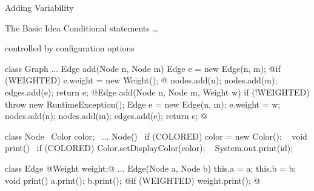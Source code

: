 \begin{frame}[fragile]{Adding Variability}
	\small
	\begin{fancycolumns}[b,widths={53},height=70mm]
		{\normalsize \begin{definition}{The Basic Idea}
			Conditional statements \ldots

			controlled by configuration options
		\end{definition}}
\begin{codetight}{}
class Graph {
	...
	Edge add(Node n, Node m) {
		Edge e = new Edge(n, m);
		@if (WEIGHTED) { e.weight = new Weight(); }@
		nodes.add(n); nodes.add(m); edges.add(e);
		return e;
	}
	@Edge add(Node n, Node m, Weight w) {
		if (!WEIGHTED) { throw new RuntimeException(); }
		Edge e = new Edge(n, m);
		e.weight = w;
		nodes.add(n); nodes.add(m); edges.add(e);
		return e;
	}@
}
\end{codetight}
	\nextcolumn
\begin{codetight}{}
class Node {
	~Color color;~
	...
	Node() {
		~if (COLORED) { color = new Color(); }~
	}
	void print() {
		~if (COLORED) { Color.setDisplayColor(color); }~
		System.out.print(id);
	}
}
\end{codetight}
\begin{codetight}{}
class Edge {
	@Weight weight;@
	...
	Edge(Node a, Node b) {
		this.a = a; this.b = b;
	}
	void print() {
		a.print(); b.print();
		@if (WEIGHTED) { weight.print(); }@
	}
}
\end{codetight}
	\end{fancycolumns}
\end{frame}

